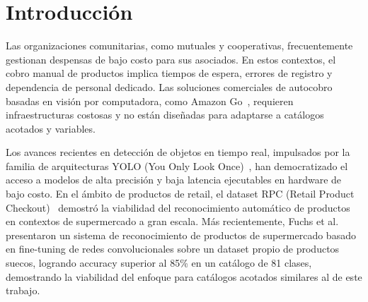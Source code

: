 \documentclass[conference,a4paper]{IEEEtran}[2015/08/26]
\begin{document}
%
\IEEEpeerreviewmaketitle

\section{Introducción}
\label{sec:introduccion}

Las organizaciones comunitarias, como mutuales y cooperativas, frecuentemente gestionan despensas de bajo costo para sus asociados. En estos contextos, el cobro manual de productos implica tiempos de espera, errores de registro y dependencia de personal dedicado. Las soluciones comerciales de autocobro basadas en visión por computadora, como Amazon Go~\cite{amazongo}, requieren infraestructuras costosas y no están diseñadas para adaptarse a catálogos acotados y variables.

Los avances recientes en detección de objetos en tiempo real, impulsados por la familia de arquitecturas YOLO (You Only Look Once)~\cite{redmon2016yolo, redmon2018yolov3, wang2024yolov10}, han democratizado el acceso a modelos de alta precisión y baja latencia ejecutables en hardware de bajo costo. En el ámbito de productos de retail, el dataset RPC (Retail Product Checkout)~\cite{wei2019rpc} demostró la viabilidad del reconocimiento automático de productos en contextos de supermercado a gran escala. Más recientemente, Fuchs et al.~\cite{fuchs2019grocerystore} presentaron un sistema de reconocimiento de productos de supermercado basado en fine-tuning de redes convolucionales sobre un dataset propio de productos suecos, logrando accuracy superior al 85\% en un catálogo de 81 clases, demostrando la viabilidad del enfoque para catálogos acotados similares al de este trabajo.
\end{document}
